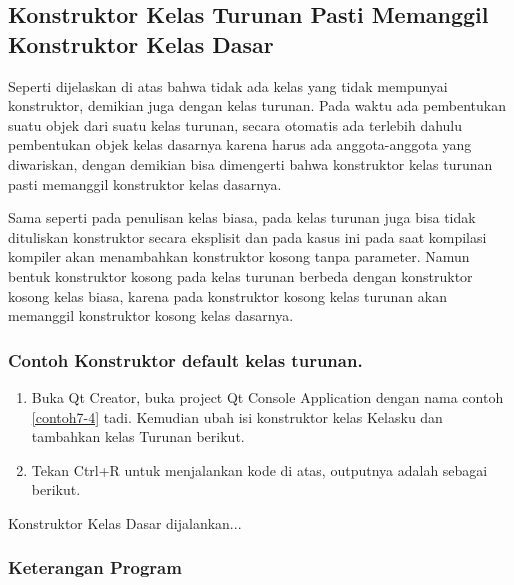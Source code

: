 \subsection{Konstruktor Kelas Turunan Pasti Memanggil Konstruktor Kelas Dasar}\label{konstruktor-kelas-turunan-pasti-memanggil-konstruktor-kelas-dasar}

Seperti dijelaskan di atas bahwa tidak ada kelas yang tidak mempunyai
konstruktor, demikian juga dengan kelas turunan. Pada waktu ada
pembentukan suatu objek dari suatu kelas turunan, secara otomatis ada
terlebih dahulu pembentukan objek kelas dasarnya karena harus ada
anggota-anggota yang diwariskan, dengan demikian bisa dimengerti bahwa
konstruktor kelas turunan pasti memanggil konstruktor kelas dasarnya.

Sama seperti pada penulisan kelas biasa, pada kelas turunan juga bisa
tidak dituliskan konstruktor secara eksplisit dan pada kasus ini pada
saat kompilasi kompiler akan menambahkan konstruktor kosong tanpa
parameter. Namun bentuk konstruktor kosong pada kelas turunan berbeda
dengan konstruktor kosong kelas biasa, karena pada konstruktor kosong
kelas turunan akan memanggil konstruktor kosong kelas dasarnya.

\subsubsection*{Contoh Konstruktor default kelas turunan.}

\begin{enumerate}

\item
  Buka Qt Creator, buka project Qt Console Application dengan nama
  contoh \ref{contoh7-4} tadi. Kemudian ubah isi konstruktor kelas Kelasku dan
  tambahkan kelas Turunan berikut.




\item
  Tekan Ctrl+R untuk menjalankan kode di atas, outputnya adalah sebagai
  berikut.
\end{enumerate}

\begin{lcverbatim}
Konstruktor Kelas Dasar dijalankan...
\end{lcverbatim}


\subsubsection*{Keterangan Program}

